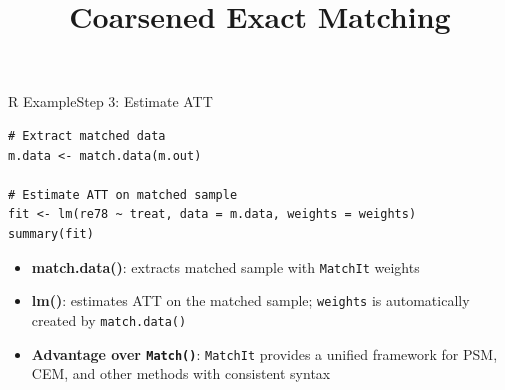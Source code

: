 \documentclass[dvipsnames,hyperref={pdfpagelabels=false}]{beamer}
\begin{document}
\begin{frame}[fragile]{R Example}{Step 3: Estimate ATT}
\begin{lstlisting}
# Extract matched data
m.data <- match.data(m.out)

# Estimate ATT on matched sample
fit <- lm(re78 ~ treat, data = m.data, weights = weights)
summary(fit)
\end{lstlisting}
\begin{itemize}
    \vspace{0.2cm}
    \item \textbf{match.data()}: extracts matched sample with
    \texttt{MatchIt} weights
    \vspace{0.2cm}
    \item \textbf{lm()}: estimates ATT on the matched sample;
    \texttt{weights} is automatically created by \texttt{match.data()}
    \vspace{0.2cm}
    \item \textbf{Advantage over \texttt{Match()}}: \texttt{MatchIt}
    provides a unified framework for PSM, CEM, and other methods
    with consistent syntax
\end{itemize}
\end{frame}


\title[]
{Coarsened Exact Matching }

\author
{}

\institute{}

\date
{}

\begin{frame}{}
\titlepage
\end{frame}
\end{document}
